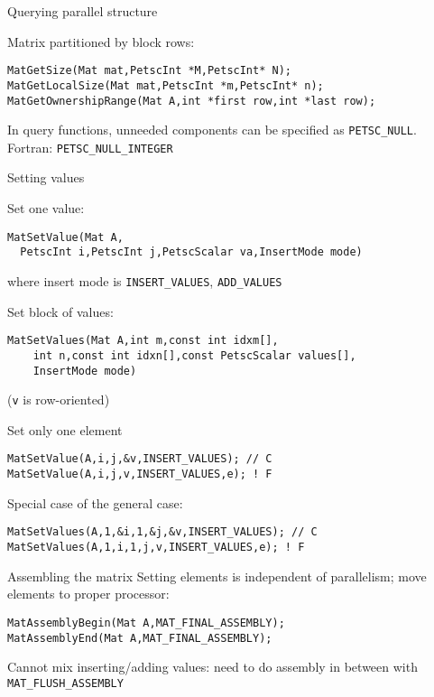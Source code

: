 \begin{numberedframe}{Querying parallel structure}

Matrix partitioned by block rows:
\begin{lstlisting}
MatGetSize(Mat mat,PetscInt *M,PetscInt* N);
MatGetLocalSize(Mat mat,PetscInt *m,PetscInt* n);
MatGetOwnershipRange(Mat A,int *first row,int *last row);
\end{lstlisting}
 In query functions, unneeded components can be specified as
 \lstinline{PETSC_NULL}.\\
 Fortran: \lstinline{PETSC_NULL_INTEGER}
\end{numberedframe}

\begin{numberedframe}{Setting values}

Set one value:
\begin{lstlisting}
MatSetValue(Mat A,
  PetscInt i,PetscInt j,PetscScalar va,InsertMode mode)
\end{lstlisting}
where insert mode is \lstinline{INSERT_VALUES}, \lstinline{ADD_VALUES}

Set block of values:
\begin{lstlisting}
MatSetValues(Mat A,int m,const int idxm[],
    int n,const int idxn[],const PetscScalar values[],
    InsertMode mode)
\end{lstlisting}
(\lstinline{v} is row-oriented)
\end{numberedframe}

\begin{numberedframe}{Set only one element}
\begin{lstlisting}
MatSetValue(A,i,j,&v,INSERT_VALUES); // C
MatSetValue(A,i,j,v,INSERT_VALUES,e); ! F
\end{lstlisting}
Special case of the general case:
\begin{lstlisting}
MatSetValues(A,1,&i,1,&j,&v,INSERT_VALUES); // C
MatSetValues(A,1,i,1,j,v,INSERT_VALUES,e); ! F
\end{lstlisting}
\end{numberedframe}

\begin{numberedframe}{Assembling the matrix}
Setting elements is independent of parallelism; move elements to
proper processor:
\begin{lstlisting}
MatAssemblyBegin(Mat A,MAT_FINAL_ASSEMBLY);
MatAssemblyEnd(Mat A,MAT_FINAL_ASSEMBLY);
\end{lstlisting}

Cannot mix inserting/adding values: need to do assembly in between
with \lstinline{MAT_FLUSH_ASSEMBLY}
\end{numberedframe}

